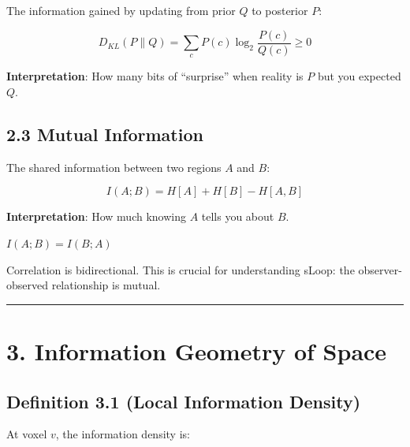 \documentclass[
  11pt,
  letterpaper,
  twoside,
  openright]{book}
\begin{document}
The information gained by updating from prior \(Q\) to posterior \(P\):

\[D_{KL}(P \| Q) = \sum_c P(c) \log_2 \frac{P(c)}{Q(c)} \geq 0\]

\textbf{Interpretation}: How many bits of ``surprise'' when reality is
\(P\) but you expected \(Q\).

\subsection{2.3 Mutual Information}\label{mutual-information}

The shared information between two regions \(A\) and \(B\):

\[I(A; B) = H[A] + H[B] - H[A, B]\]

\textbf{Interpretation}: How much knowing \(A\) tells you about \(B\).

\begin{tcolorbox}[enhanced jigsaw, coltitle=black, colbacktitle=quarto-callout-important-color!10!white, toprule=.15mm, colframe=quarto-callout-important-color-frame, arc=.35mm, opacityback=0, bottomtitle=1mm, toptitle=1mm, breakable, colback=white, titlerule=0mm, opacitybacktitle=0.6, title=\textcolor{quarto-callout-important-color}{\faExclamation}\hspace{0.5em}{Mutual Information is Symmetric}, rightrule=.15mm, bottomrule=.15mm, leftrule=.75mm, left=2mm]

\(I(A; B) = I(B; A)\)

Correlation is bidirectional. This is crucial for understanding sLoop:
the observer-observed relationship is mutual.

\end{tcolorbox}

\begin{center}\rule{0.5\linewidth}{0.5pt}\end{center}

\section{3. Information Geometry of
Space}\label{information-geometry-of-space}

\subsection{Definition 3.1 (Local Information
Density)}\label{definition-3.1-local-information-density}

At voxel \(v\), the information density is:
\end{document}
